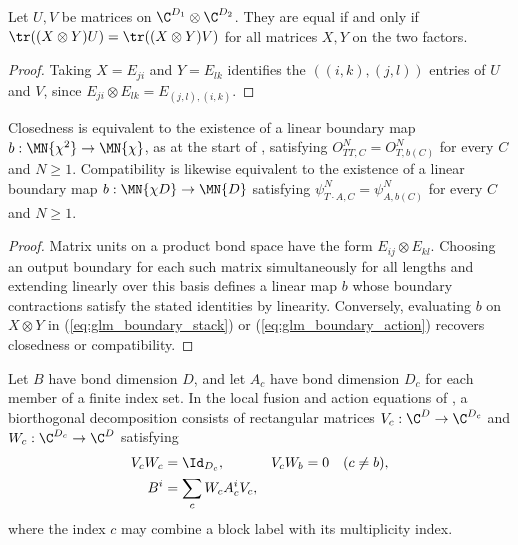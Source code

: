 \begin{lemma}
    \label{thm:glm_boundary_separation}
    \leanok
    Let $U,V$ be matrices on $\C^{D_1}\otimes\C^{D_2}$.
    They are equal if and only if
    $\tr((X\otimes Y)U)=\tr((X\otimes Y)V)$ for all matrices $X,Y$
    on the two factors.
\end{lemma}
\begin{proof}
    \leanok
    Taking $X=E_{ji}$ and $Y=E_{lk}$ identifies the
    $((i,k),(j,l))$ entries of $U$ and $V$, since
    $E_{ji}\otimes E_{lk}=E_{(j,l),(i,k)}$.
\end{proof}

\begin{lemma}
    \label{thm:glm_boundary_linear}
    \leanok
    Closedness is equivalent to the existence of a linear boundary map
    $b:\MN{\chi^2}\to\MN{\chi}$, as at the start of
    \cite[Appendix~A]{GarreRubio2023MPOSym}, satisfying
    $O^N_{TT,C}=O^N_{T,b(C)}$ for every $C$ and $N\geq1$.
    Compatibility is likewise equivalent to the existence of a linear boundary
    map $b:\MN{\chi D}\to\MN{D}$ satisfying
    $\psi^N_{T\cdot A,C}=\psi^N_{A,b(C)}$ for every $C$ and $N\geq1$.
\end{lemma}
\begin{proof}
    \leanok
    Matrix units on a product bond space have the form $E_{ij}\otimes E_{kl}$.
    Choosing an output boundary for each such matrix simultaneously for all
    lengths and extending linearly over this basis defines a linear map $b$
    whose boundary contractions satisfy the stated identities by linearity.
    Conversely, evaluating $b$ on $X\otimes Y$ in
    (\ref{eq:glm_boundary_stack}) or (\ref{eq:glm_boundary_action}) recovers
    closedness or compatibility.
\end{proof}

\begin{definition}
    \label{def:glm_boundary_decomposition}
    \leanok
    Let $B$ have bond dimension $D$, and let $A_c$ have bond dimension
    $D_c$ for each member of a finite index set. In the local fusion and
    action equations of \cite[Section~2]{GarreRubio2023MPOSym}, a biorthogonal
    decomposition consists of rectangular matrices $V_c:\C^D\to\C^{D_c}$ and
    $W_c:\C^{D_c}\to\C^D$ satisfying
    \begin{align}
        V_cW_c & =\Id_{D_c},         & V_cW_b & =0\quad(c\ne b),
        \label{eq:glm_boundary_biorthogonal}                     \\
        B^i    & =\sum_cW_cA_c^iV_c,
        \label{eq:glm_boundary_letter}
    \end{align}
    where the index $c$ may combine a block label with its multiplicity index.
\end{definition}

